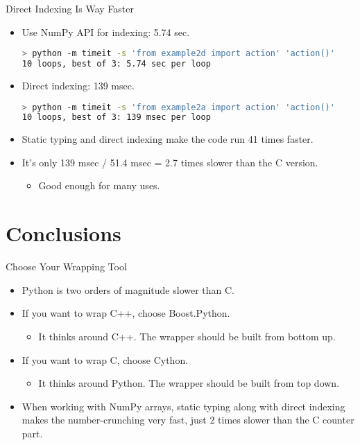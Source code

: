 \documentclass[dvips,xcolor=pst,14pt]{beamer}
\begin{document}
\begin{frame}[fragile]{
%
Direct Indexing Is Way Faster
%
}
\begin{itemize}
\item Use NumPy API for indexing: 5.74 sec.
\begin{lstlisting}[language=bash]
> python -m timeit -s 'from example2d import action' 'action()'
10 loops, best of 3: 5.74 sec per loop
\end{lstlisting}
\item Direct indexing: 139 msec. 
\begin{lstlisting}[language=bash]
> python -m timeit -s 'from example2a import action' 'action()'
10 loops, best of 3: 139 msec per loop
\end{lstlisting}
\item Static typing and direct indexing make the code run \alert{41} times
faster.
\item It's only 139 msec / 51.4 msec = 2.7 times slower than the C version.
\begin{itemize}
  \item Good enough for many uses.
\end{itemize}
\end{itemize}
\end{frame}

\section{
Conclusions
}

\begin{frame}{
%
Choose Your Wrapping Tool
%
}
\begin{itemize}
\item Python is two orders of magnitude slower than C.
\item If you want to wrap C++, choose Boost.Python.
\begin{itemize}
  \item It thinks around C++.  The wrapper should be built from bottom up.
\end{itemize}
\item If you want to wrap C, choose Cython.
\begin{itemize}
  \item It thinks around Python.  The wrapper should be built from top down.
\end{itemize}
\item When working with NumPy arrays, static typing along with direct indexing
makes the number-crunching very fast, just 2 times slower than the C counter
part.
\end{itemize}
\end{frame}
\end{document}
